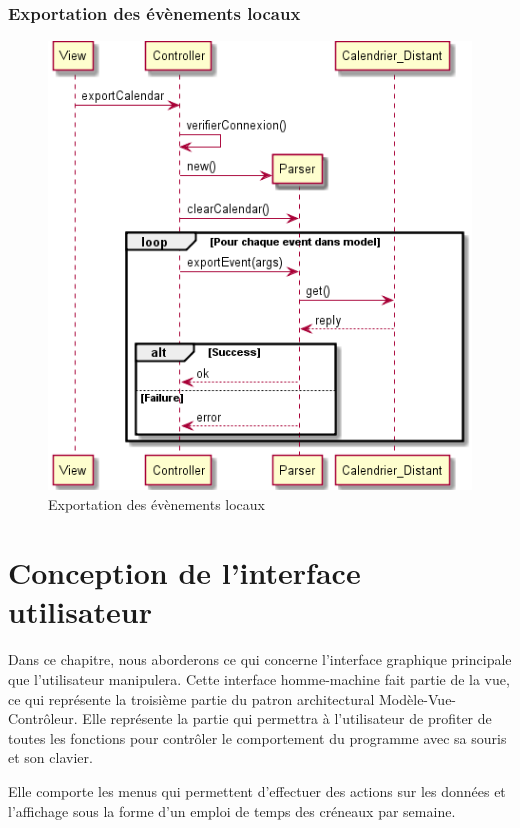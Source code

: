 		\subsection{Exportation des évènements locaux}
			\begin{figure}[!h]
				\centering
				\includegraphics[scale=0.65]{diagseq_exportEvent.png}
				\caption{Exportation des évènements locaux}
			\end{figure}
			\FloatBarrier

\chapter{Conception de l'interface utilisateur}
    Dans ce chapitre, nous aborderons ce qui concerne l'interface graphique principale que l'utilisateur manipulera. Cette interface homme-machine fait partie de la vue, ce qui représente la troisième partie du patron architectural Modèle-Vue-Contrôleur. Elle représente la partie qui permettra à l'utilisateur de profiter de toutes les fonctions pour contrôler le comportement du programme avec sa souris et son clavier.
    
    Elle comporte les menus qui permettent d'effectuer des actions sur les données et l'affichage sous la forme d'un emploi de temps des créneaux par semaine.

